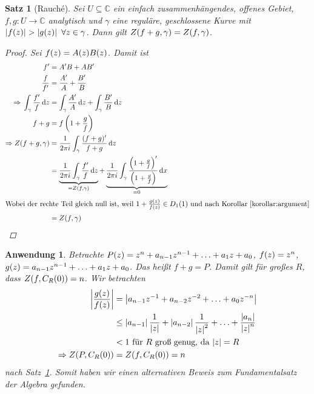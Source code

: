 \documentclass[11pt, a4paper]{article}
\theoremstyle{plain}
\newtheorem{satz}[blockelement]{Satz}
\newtheorem{anwendung}[blockelement]{Anwendung}
\numberwithin{equation}{subsection}
\newcommand{\pair}[1]{\left(#1\right)}
\newcommand{\of}[1]{\mathopen{}\mathclose{}\bgroup\left(#1\aftergroup\egroup\right)}
\newcommand{\abs}[1]{\left\lvert#1\right\rvert}
\newcommand{\impl}[0]{\Rightarrow{}}
\newcommand{\dif}{\mathop{}\!\mathrm{d}}
\newcommand{\C}{\mathbb{C}}
\begin{document}
    \begin{satz}[Rauché] %
        \label{satz:rauche}
        Sei $U\subseteq\C$ ein einfach zusammenhängendes, offenes Gebiet, $f,g: U\to\C$ analytisch und $\gamma$ eine reguläre, geschlossene Kurve mit $\abs{f\of{z}} > \abs{g\of{z}}~\forall z\in\gamma$. Dann gilt $Z\of{f+g, \gamma} = Z\of{f, \gamma}$.

        \begin{proof}
            Sei $f\of{z} = A\of{z}B\of{z}$. Damit ist
            \begin{align*}
                f' &= A'B + AB'\\
                \frac{f}{f'} &= \frac{A'}{A} + \frac{B'}{B}\\
                \impl \int_{\gamma}^{} \frac{f'}{f} \dif z &= \int_{\gamma}^{} \frac{A'}{A} \dif z + \int_{\gamma}^{} \frac{B'}{B} \dif z\\
                f + g &= f\pair{1 + \frac{g}{f}}\\
                \impl Z\of{f+g, \gamma} &= \frac{1}{2\pi i} \int_{\gamma}^{} \frac{(f+g)'}{f+g} \dif z\\
                &= \underbrace{\frac{1}{2\pi i} \int_{\gamma}^{} \frac{f'}{f} \dif z}_{= Z\of{f, \gamma}} + \underbrace{\frac{1}{2\pi i} \int_{\gamma}^{} \frac{\pair{1+\frac{g}{f}}'}{\pair{1+\frac{g}{f}}} \dif x}_{=0}\\
                \intertext{Wobei der rechte Teil gleich null ist, weil $1+\frac{g\of{z}}{f\of{z}}\in D_1\of{1}$ und nach Korollar~\ref{korollar:argument}}
                &= Z\of{f, \gamma}\qedhere
            \end{align*}
        \end{proof}
    \end{satz}

    \begin{anwendung}
        Betrachte $P\of{z} = z^n + a_{n-1} z^{n-1} + \ldots + a_1 z + a_0$, $f\of{z} = z^n$, $g\of{z} = a_{n-1}z^{n-1} + \ldots + a_1 z + a_0$. Das heißt $f + g = P$. Damit gilt für großes $R$, dass $Z\of{f, C_R\of{0}} = n$. Wir betrachten
        \begin{align*}
            \abs{\frac{g\of{z}}{f\of{z}}} &= \abs{a_{n-1} z^{-1} + a_{n-2}z^{-2} + \ldots + a_0 z^{-n}}\\
            &\leq \abs{a_{n-1}} \frac{1}{\abs{z}} + \abs{a_{n-2}}\frac{1}{\abs{z}^2} + \ldots + \frac{\abs{a_n}}{\abs{z}^n}\\
            &< 1 \text{ für $R$ groß genug, da $\abs{z} = R$}\\
            \impl Z\of{P, C_R\of{0}} &= Z\of{f, C_R\of{0}} = n
        \end{align*}
        nach Satz~\ref{satz:rauche}. Somit haben wir einen alternativen Beweis zum Fundamentalsatz der Algebra gefunden.
    \end{anwendung}
\end{document}
